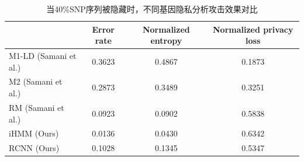 \begin{table}[htbp]
	\caption{当40\%SNP序列被隐藏时，不同基因隐私分析攻击效果对比}
	\label{tab:performance-40per}
	\begin{tabular}{lccc}
		\hline
		& Error rate & Normalized entropy & Normalized privacy loss \\
		\hline
		M1-LD (Samani et al.) & 0.3623 & 0.4867 & 0.1873 \\
		M2 (Samani et al.)    & 0.2873 & 0.3489 & 0.3251 \\
		RM (Samani et al.)    & 0.0923 & 0.0902 & 0.5838 \\
		iHMM (Ours)          & 0.0136 & 0.0430 & 0.6342 \\
		RCNN (Ours)          & 0.1028 & 0.1345 & 0.5347\\
		\hline
	\end{tabular}
\end{table}

